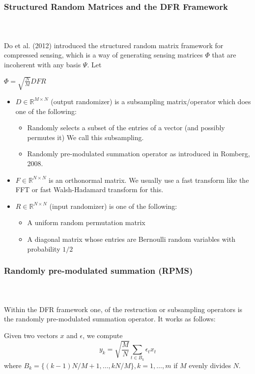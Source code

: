 
\begin{frame}[t]
	\frametitle{Structured Random Matrices and the DFR Framework}
	\framesubtitle{~~}  %

	Do et al. (2012) introduced the structured random matrix framework for compressed sensing,
	which is a way of generating sensing matrices $\Phi$ that are incoherent with any basis $\Psi$. Let 

	\centering
	$	\Phi = \sqrt{\frac{N}{M}}DFR$

	\begin{itemize}
	\item $D\in \mathbb{R}^{M\times N}$ (output randomizer) is a subsampling matrix/operator which does one of the following:
		\begin{itemize}
		\item Randomly selects a subset of the entries of a vector (and possibly permutes it) We call this subsampling.
		\item Randomly pre-modulated summation operator as introduced in Romberg, 2008.
		\end{itemize}
	\item $F\in\mathbb{R}^{N\times N}$ is an orthonormal matrix. We usually use a fast transform like the FFT or 
		fast Walsh-Hadamard transform for this.
	\item $R\in\mathbb{R}^{N\times N}$ (input randomizer) is one of the following:
		\begin{itemize}
			\item A uniform random permutation matrix
			\item A diagonal matrix whose entries are Bernoulli random variables with probability $1/2$
		\end{itemize}
	\end{itemize}

\end{frame}

\begin{frame}[t]
	\frametitle{Randomly pre-modulated summation (RPMS)}
	\framesubtitle{~~}  %
	
	Within the DFR framework one, of the restruction or subsampling operators is the
	randomly pre-modulated summation operator. It works as follows:

	Given two vectors $x$ and $\epsilon$, we compute
	\begin{equation}
		y_k = \sqrt{\frac{M}{N}}\sum_{t\in B_k}\epsilon_t x_t
	\end{equation}
	where
	$B_k = \{(k-1)N/M + 1, \ldots, kN/M  \}, k = 1,\ldots,m$ if $M$ evenly divides $N$.

\end{frame}

